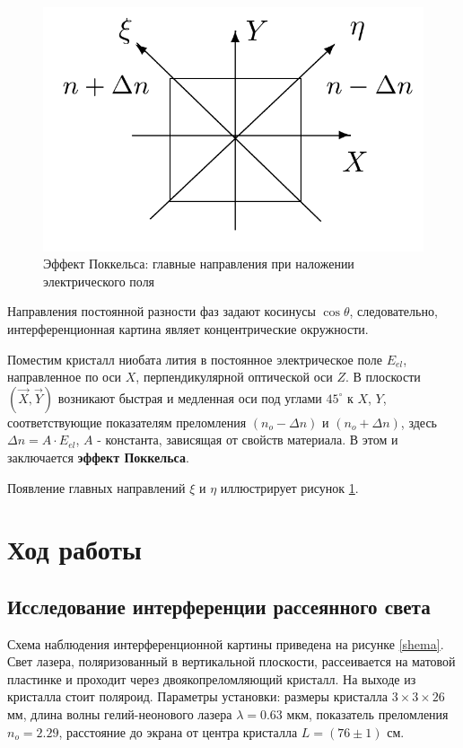 \documentclass[a4paper,12pt]{article}
\begin{document}
\begin{figure} 
	\includegraphics[width=\linewidth]{maindir}
	\caption{Эффект Поккельса: главные направления при наложении электрического поля}
	\label{dir}
\end{figure}


Направления постоянной разности фаз задают косинусы $\cos\theta$, следовательно, интерференционная картина являет концентрические окружности. 

Поместим кристалл ниобата лития в постоянное электрическое поле $E_{el}$, направленное по оси $X$, перпендикулярной оптической оси $Z$. В плоскости $(\overrightarrow{X}, \overrightarrow{Y})$ возникают быстрая и медленная оси под углами $45^\circ$ к $X$, $Y$, соответствующие показателям преломления $(n_o - \Delta n)$ и $(n_o + \Delta n)$, здесь $\Delta n = A\cdot E_{el}$, $A$ - константа, зависящая от свойств материала. В этом и заключается \textbf{эффект Поккельса}. 

Появление главных направлений $\xi$ и $\eta$ иллюстрирует рисунок \ref{dir}. 

\section*{Ход работы}

\subsection*{Исследование интерференции рассеянного света}

	Схема наблюдения интерференционной картины приведена на рисунке \ref{shema}. Свет лазера, поляризованный в вертикальной плоскости, рассеивается на матовой пластинке и проходит через двоякопреломляющий кристалл. На выходе из кристалла стоит поляроид. Параметры установки: размеры кристалла $3 \times 3 \times 26$ мм, длина волны гелий-неонового лазера $\lambda = 0.63$ мкм, показатель преломления $n_o = 2.29$, расстояние до экрана от центра кристалла $L = (76 \pm 1)$ см. 
	
\end{document}

